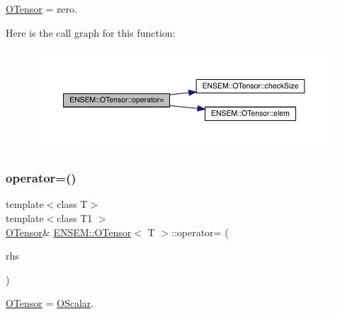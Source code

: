 \mbox{\hyperlink{classENSEM_1_1OTensor}{O\+Tensor}} = zero. 

Here is the call graph for this function\+:
\nopagebreak
\begin{figure}[H]
\begin{center}
\leavevmode
\includegraphics[width=350pt]{da/d8a/classENSEM_1_1OTensor_aae562552ce915d3d39c65dfe463fa50a_cgraph}
\end{center}
\end{figure}
\mbox{\label{classENSEM_1_1OTensor_ae763ca68be1d6b8d5b27b8d544ab5f2d}} 
\subsubsection{\texorpdfstring{operator=()}{operator=()}\hspace{0.1cm}{\footnotesize\ttfamily [4/12]}}
{\footnotesize\ttfamily template$<$class T$>$ \\
template$<$class T1 $>$ \\
\mbox{\hyperlink{classENSEM_1_1OTensor}{O\+Tensor}}\& \mbox{\hyperlink{classENSEM_1_1OTensor}{E\+N\+S\+E\+M\+::\+O\+Tensor}}$<$ T $>$\+::operator= (\begin{DoxyParamCaption}\item[{const \mbox{\hyperlink{classENSEM_1_1OScalar}{O\+Scalar}}$<$ T1 $>$ \&}]{rhs }\end{DoxyParamCaption})\hspace{0.3cm}{\ttfamily [inline]}}



\mbox{\hyperlink{classENSEM_1_1OTensor}{O\+Tensor}} = \mbox{\hyperlink{classENSEM_1_1OScalar}{O\+Scalar}}. 

